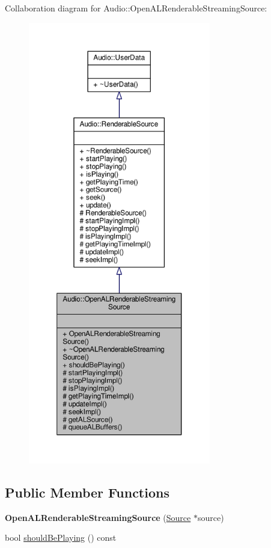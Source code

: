 Collaboration diagram for Audio\+:\+:Open\+A\+L\+Renderable\+Streaming\+Source\+:
\nopagebreak
\begin{figure}[H]
\begin{center}
\leavevmode
\includegraphics[height=550pt]{d5/d03/classAudio_1_1OpenALRenderableStreamingSource__coll__graph}
\end{center}
\end{figure}
\subsection*{Public Member Functions}
\begin{DoxyCompactItemize}
\item 
{\bfseries Open\+A\+L\+Renderable\+Streaming\+Source} (\hyperlink{classAudio_1_1Source}{Source} $\ast$source)\hypertarget{classAudio_1_1OpenALRenderableStreamingSource_a07450f54ad07bc10e99ec7184102ff5d}{}\label{classAudio_1_1OpenALRenderableStreamingSource_a07450f54ad07bc10e99ec7184102ff5d}

\item 
bool \hyperlink{classAudio_1_1OpenALRenderableStreamingSource_a499d1e14bf34896dfe3c690229c85fd6}{should\+Be\+Playing} () const 
\end{DoxyCompactItemize}
